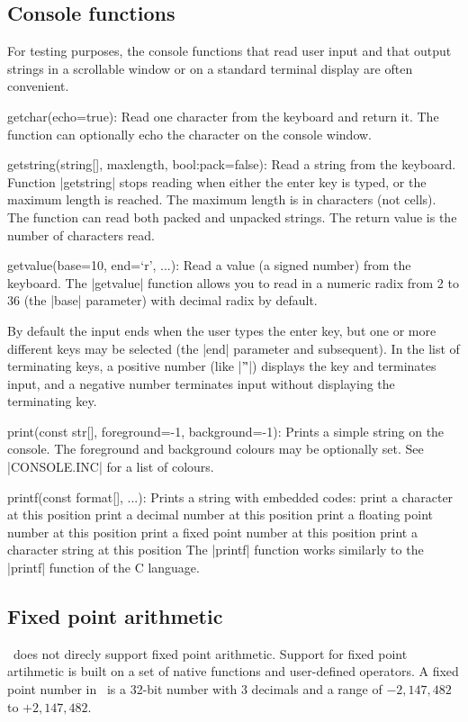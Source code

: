\subsection{Console functions}
For testing purposes, the console functions that read user input and that
output strings in a scrollable window or on a standard terminal display are
often convenient.

\beginlist{35pt}
\item getchar(echo=true):
  Read one character from the keyboard and return it. The function can
  optionally echo the character on the console window.
\item getstring(string[], maxlength, bool:pack=false):
  Read a string from the keyboard. Function |getstring| stops reading when
  either the enter key is typed, or the maximum length is reached. The
  maximum length is in characters (not cells). The function can read both
  packed and unpacked strings. The return value is the number of characters
  read.
\item getvalue(base=10, end=`\hatop r', ...):
  Read a value (a signed number) from the keyboard. The |getvalue| function
  allows you to read in a numeric radix from 2 to 36 (the |base| parameter)
  with decimal radix by default.

  By default the input ends when the user types the enter key, but one or more
  different keys may be selected (the |end| parameter and subsequent). In the
  list of terminating keys, a positive number (like |'\r'|) displays the key
  and terminates input, and a negative number terminates input without
  displaying the terminating key.
\item print(const str[], foreground=-1, background=-1):
  Prints a simple string on the console. The foreground and background colours
  may be optionally set. See |CONSOLE.INC| for a list of colours.
\item printf(const format[], ...):
  Prints a string with embedded codes:
  \beginlist{2em} \compactlist
   print a character at this position
   print a decimal number at this position
   print a floating point number at this position
   print a fixed point number at this position
   print a character string at this position
  \endlist
  The |printf| function works similarly to the |printf| function of the
  C language.
\endlist


\subsection{Fixed point arithmetic}
\Small\ does not direcly support fixed point arithmetic. Support for fixed point
artihmetic is built on a set of native functions and user-defined operators.
A fixed point number in \Small\ is a 32-bit number with 3 decimals and a range
of $-2,147,482$ to $+2,147,482$.

